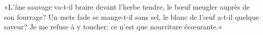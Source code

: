«L’âne sauvage va-t-il braire devant l’herbe tendre,
	le bœuf meugler auprès de son fourrage?
Un mets fade se mange-t-il sans sel, le blanc de l’œuf a-t-il quelque saveur?
Je me refuse à y toucher; ce n’est que nourriture écœurante.»
